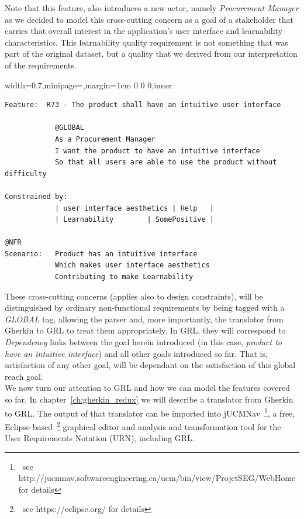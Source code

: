 \documentclass[dissertation,final]{softeng}
\newcommand{\nfrs}{non-functional requirements\xspace}
\newenvironment{featurecode}[1]
{ \lrbox\featurebox \begin{adjustbox}{width=#1\textwidth,minipage=\textwidth,margin=1cm 0 0 0,inner} }
{ \end{adjustbox}\endlrbox}
\newenvironment{featurelist}[2]
{
\newcommand{\setcaption}{\caption{#1}}
\newcommand{\setlabel}{\label{#2}}
}
{\begin{listing}[h!]\centering\usebox\featurebox\setcaption\setlabel\end{listing}}
\begin{document}
Note that this feature, also introduces a new actor, namely \emph{Procurement Manager} as we decided to model this cross-cutting concern as a goal of a stakeholder that carries that overall interest in the application's user interface and learnability characteristics. This learnability quality requirement is not something that was part of the original dataset, but a quality that we derived from our interpretation of the requirements.

\begin{featurelist}{Changes to Gherkin -- R73 -- The product shall have an intuitive user interface}{lst:feature_r73}
\begin{featurecode}{0.7}
\begin{verbatim}
Feature:  R73 - The product shall have an intuitive user interface
			
            @GLOBAL
            As a Procurement Manager
            I want the product to have an intuitive interface
            So that all users are able to use the product without difficulty
	
Constrained by:
            | user interface aesthetics | Help	 |
            | Learnability	      | SomePositive |
		
@NFR		
Scenario:   Product has an intuitive interface
            Which makes user interface aesthetics
            Contributing to make Learnability
\end{verbatim}
\end{featurecode}
\end{featurelist}

These cross-cutting concerns (applies also to design constraints), will be distinguished by ordinary \nfrs by being tagged with a \emph{GLOBAL} tag, allowing the parser and, more importantly, the translator from Gherkin to GRL to treat them appropriately. In GRL, they will correspond to \emph{Dependency} links between the goal herein introduced (in this case, \emph{product to have an intuitive interface}) and all other goals introduced so far. That is, satisfaction of any other goal, will be dependant on the satisfaction of this global reach goal.\\

We now turn our attention to GRL and how we can model the features covered so far. In chapter~\ref{ch:gherkin_redux} we will describe a translator from Gherkin to GRL. The output of that translator can be imported into jUCMNav~\footnote{~see http://jucmnav.softwareengineering.ca/ucm/bin/view/ProjetSEG/WebHome for details}, a free, Eclipse-based~\footnote{~see https://eclipse.org/ for details} graphical editor and analysis and transformation tool for the User Requirements Notation (URN), including GRL.
\end{document}
